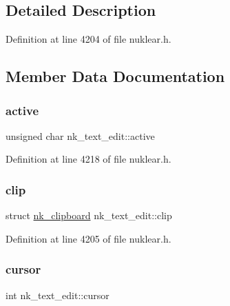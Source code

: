 \subsection{Detailed Description}


Definition at line 4204 of file nuklear.\+h.



\subsection{Member Data Documentation}
\mbox{\label{structnk__text__edit_a3d42a1c0032985e789fea827bc46c16a}} 
\subsubsection{\texorpdfstring{active}{active}}
{\footnotesize\ttfamily unsigned char nk\+\_\+text\+\_\+edit\+::active}



Definition at line 4218 of file nuklear.\+h.

\mbox{\label{structnk__text__edit_a739e4da59f61a18ea51f9e17e970316a}} 
\subsubsection{\texorpdfstring{clip}{clip}}
{\footnotesize\ttfamily struct \mbox{\hyperlink{structnk__clipboard}{nk\+\_\+clipboard}} nk\+\_\+text\+\_\+edit\+::clip}



Definition at line 4205 of file nuklear.\+h.

\mbox{\label{structnk__text__edit_a40a308833ab82a4fd41aa1ce013d4430}} 
\subsubsection{\texorpdfstring{cursor}{cursor}}
{\footnotesize\ttfamily int nk\+\_\+text\+\_\+edit\+::cursor}



